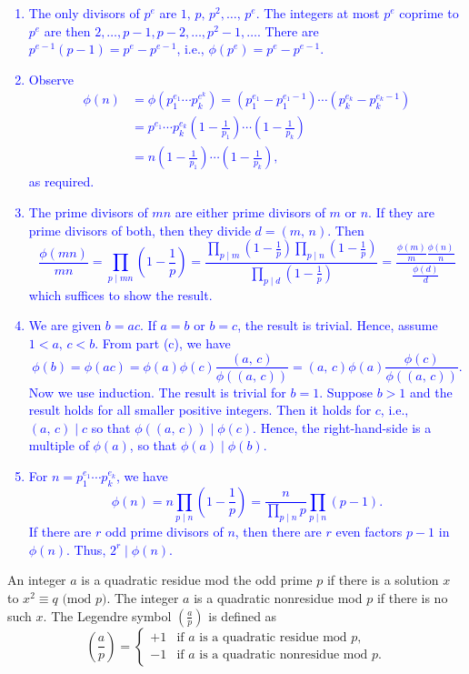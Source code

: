 \documentclass[a4paper,11pt]{article}
\theoremstyle{mythm}
\theoremstyle{mydef}
\newcommand{\blue}[1]{\textcolor{blue}{#1}}
\renewcommand{\pmod}[1]{\text{ (mod $#1$)}}
\begin{document}
\blue{
  \begin{enumerate}[{\bf (a)}]
  \item The only divisors of $p^e$ are $1,\,p,\,p^2,\dots,\,p^e$. The integers
    at most $p^e$ coprime to $p^e$ are then $2,\dots,p-1,p-2,\dots,p^2-1,\dots$.
    There are $p^{e-1}(p-1)=p^e-p^{e-1}$, i.e., $\phi(p^e)=p^e-p^{e-1}$.
  \item Observe
    \begin{align*}
      \phi(n) &= \phi(p_1^{e_1} \cdots p_k^{e^k}) = (p_1^{e_1}-p_1^{e_1-1}) \cdots (p_k^{e_k}-p_k^{e_k-1}) \\
      &= p^{e_1} \cdots p_k^{e_k}\left( 1-\frac{1}{p_1} \right) \cdots \left( 1-\frac{1}{p_k} \right) \\
      &= n\left( 1-\frac{1}{p_1} \right) \cdots \left( 1-\frac{1}{p_k} \right),
    \end{align*}
    as required.
  \item The prime divisors of $mn$ are either prime divisors of $m$ or $n$. If
    they are prime divisors of both, then they divide $d=(m,\,n)$. Then
    \[
      \frac{\phi(mn)}{mn} = \prod_{p \mid mn}\left( 1-\frac{1}{p} \right) =
      \frac{\prod_{p \mid m}\left( 1-\frac{1}{p} \right)\prod_{p \mid n}\left(
          1-\frac{1}{p} \right)}{\prod_{p \mid d}\left( 1-\frac{1}{p} \right)}
      = \frac{\frac{\phi(m)}{m}\frac{\phi(n)}{n}}{\frac{\phi(d)}{d}}
    \]
    which suffices to show the result.
  \item We are given $b=ac$. If $a=b$ or $b=c$, the result is trivial. Hence,
    assume $1 < a,\,c < b$. From part (c), we have
    \[
      \phi(b) = \phi(ac) = \phi(a)\phi(c)\frac{(a,\,c)}{\phi((a,\,c))} =
      (a,\,c)\phi(a)\frac{\phi(c)}{\phi((a,\,c))}.
    \]
    Now we use induction. The result is trivial for $b=1$. Suppose $b>1$ and the
    result holds for all smaller positive integers. Then it holds for $c$, i.e.,
    $(a,\,c) \mid c$ so that $\phi((a,\,c)) \mid \phi(c)$. Hence, the
    right-hand-side is a multiple of $\phi(a)$, so that $\phi(a) \mid \phi(b)$.
  \item For $n=p_1^{e_1} \cdots p_k^{e_k}$, we have
    \[
      \phi(n) = n\prod_{p \mid n}\left( 1-\frac{1}{p} \right) =
      \frac{n}{\prod_{p \mid n}p}\prod_{p \mid n}(p-1).
    \]
    If there are $r$ odd prime divisors of $n$, then there are $r$ even factors
    $p-1$ in $\phi(n)$. Thus, $2^r \mid \phi(n)$.
  \end{enumerate}
}

An integer $a$ is a quadratic residue mod the odd prime $p$ if there is a
solution $x$ to $x^2 \equiv q \pmod{p}$. The integer $a$ is a quadratic
nonresidue mod $p$ if there is no such $x$. The Legendre symbol $(\frac{a}{p})$
is defined as
\[
  \left( \frac{a}{p} \right) =
  \begin{cases}
    +1 & \text{if $a$ is a quadratic residue mod $p$,} \\
    -1 & \text{if $a$ is a quadratic nonresidue mod $p$.}
  \end{cases}
\] \\
\end{document}
